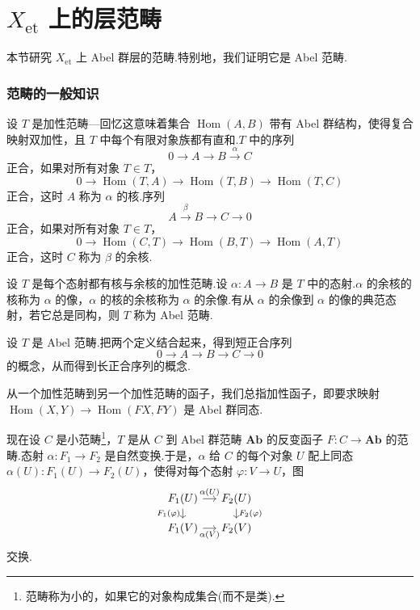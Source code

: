 ﻿%
\chapter{\texorpdfstring{$X_{\mathrm{et}}$ 上的层范畴}{X\_et 上的层范畴}}\label{sec:7}

本节研究 $X_{\mathrm{et}}$ 上 Abel 群层的范畴.特别地，我们证明它是 Abel 范畴.

\subsection*{范畴的一般知识}

设 $T$ 是加性范畴---回忆这意味着集合 $\operatorname{Hom}(A, B)$ 带有 Abel 群结构，使得复合映射双加性，且 $T$ 中每个有限对象族都有直和.$T$ 中的序列
\[
0 \to A \to B \xrightarrow{\alpha} C
\]
正合，如果对所有对象 $T \in T$，
\[
0 \to \operatorname{Hom}(T, A) \to \operatorname{Hom}(T, B) \to \operatorname{Hom}(T, C)
\]
正合，这时 $A$ 称为 $\alpha$ 的核.序列
\[
A \xrightarrow{\beta} B \to C \to 0
\]
正合，如果对所有对象 $T \in T$，
\[
0 \to \operatorname{Hom}(C, T) \to \operatorname{Hom}(B, T) \to \operatorname{Hom}(A, T)
\]
正合，这时 $C$ 称为 $\beta$ 的余核.

设 $T$ 是每个态射都有核与余核的加性范畴.设 $\alpha \colon A \to B$ 是 $T$ 中的态射.$\alpha$ 的余核的核称为 $\alpha$ 的像，$\alpha$ 的核的余核称为 $\alpha$ 的余像.有从 $\alpha$ 的余像到 $\alpha$ 的像的典范态射，若它总是同构，则 $T$ 称为 Abel 范畴.

设 $T$ 是 Abel 范畴.把两个定义结合起来，得到短正合序列
\[
0 \to A \to B \to C \to 0
\]
的概念，从而得到长正合序列的概念.

从一个加性范畴到另一个加性范畴的函子，我们总指加性函子，即要求映射 $\operatorname{Hom}(X, Y) \to \operatorname{Hom}(FX, FY)$ 是 Abel 群同态.

现在设 $C$ 是小范畴\footnote{范畴称为小的，如果它的对象构成集合(而不是类).}，$T$ 是从 $C$ 到 Abel 群范畴 $\mathbf{Ab}$ 的反变函子 $F \colon C \to \mathbf{Ab}$ 的范畴.态射 $\alpha \colon F_1 \to F_2$ 是自然变换.于是，$\alpha$ 给 $C$ 的每个对象 $U$ 配上同态 $\alpha(U) \colon F_1(U) \to F_2(U)$，使得对每个态射 $\varphi \colon V \to U$，图
\[
\begin{tikzcd}[row sep=small, column sep=small]
  F_1(U) \arrow[r, "\alpha(U)"] \arrow[d, "F_1(\varphi)"'] & F_2(U) \arrow[d, "F_2(\varphi)"] \\
  F_1(V) \arrow[r, "\alpha(V)"'] & F_2(V)
\end{tikzcd}
\]
交换.


